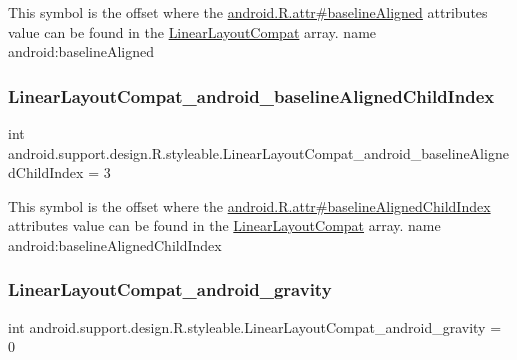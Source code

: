 This symbol is the offset where the \hyperlink{}{android.\+R.\+attr\#baseline\+Aligned} attribute\textquotesingle{}s value can be found in the \hyperlink{classandroid_1_1support_1_1design_1_1R_1_1styleable_a00b7e2da5bc1f659d80ac76716119713}{Linear\+Layout\+Compat} array.  name android\+:baseline\+Aligned \mbox{\label{classandroid_1_1support_1_1design_1_1R_1_1styleable_a37112cf8a879aba4faa808e638c0f956}} 
\subsubsection{\texorpdfstring{Linear\+Layout\+Compat\+\_\+android\+\_\+baseline\+Aligned\+Child\+Index}{LinearLayoutCompat\_android\_baselineAlignedChildIndex}}
{\footnotesize\ttfamily int android.\+support.\+design.\+R.\+styleable.\+Linear\+Layout\+Compat\+\_\+android\+\_\+baseline\+Aligned\+Child\+Index = 3\hspace{0.3cm}{\ttfamily [static]}}

This symbol is the offset where the \hyperlink{}{android.\+R.\+attr\#baseline\+Aligned\+Child\+Index} attribute\textquotesingle{}s value can be found in the \hyperlink{classandroid_1_1support_1_1design_1_1R_1_1styleable_a00b7e2da5bc1f659d80ac76716119713}{Linear\+Layout\+Compat} array.  name android\+:baseline\+Aligned\+Child\+Index \mbox{\label{classandroid_1_1support_1_1design_1_1R_1_1styleable_a0c12043536404528247f7baea154f226}} 
\subsubsection{\texorpdfstring{Linear\+Layout\+Compat\+\_\+android\+\_\+gravity}{LinearLayoutCompat\_android\_gravity}}
{\footnotesize\ttfamily int android.\+support.\+design.\+R.\+styleable.\+Linear\+Layout\+Compat\+\_\+android\+\_\+gravity = 0\hspace{0.3cm}{\ttfamily [static]}}

